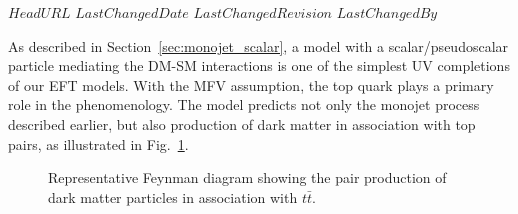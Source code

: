 \svnidlong
{$HeadURL$}
{$LastChangedDate$}
{$LastChangedRevision$}
{$LastChangedBy$}

As described in Section~\ref{sec:monojet_scalar}, a model with a scalar/pseudoscalar particle mediating the DM-SM interactions is one of the simplest UV completions of our EFT models.  With the MFV assumption, the top quark plays
a primary role in the phenomenology.   The model predicts not only
the monojet process described earlier, but also production of dark matter
in association with top pairs, as illustrated in Fig.~\ref{fig:TTbarPhi}.

\begin{figure}[h!]
\centering
  \textwidth
  \begin{feynmandiagram}[modelTTbarMET]
  \end{feynmandiagram}
\caption{Representative Feynman
diagram showing the pair production of dark matter particles in
association with $t\bar t$.}
\label{fig:TTbarPhi}
\end{figure}




